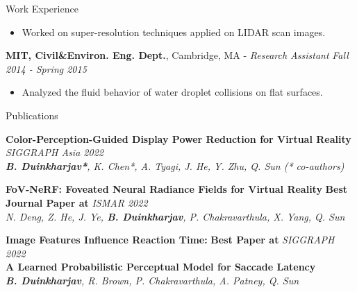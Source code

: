 \documentclass{resume}
\begin{document}
\begin{area}{Work Experience}
        \begin{itemize}
            \item Worked on super-resolution techniques applied on LIDAR scan images.
        \end{itemize}
    \item
        \textbf{MIT, Civil\&Environ. Eng. Dept.}, Cambridge, MA - \emph{Research Assistant} \hfill \emph{Fall 2014 - Spring 2015}
        \begin{itemize}
            \item Analyzed the fluid behavior of water droplet collisions on flat surfaces.
        \end{itemize}
\end{area}

\begin{area}{Publications}
    \item
        \textbf{Color-Perception-Guided Display Power Reduction for Virtual Reality}
        \hfill
        \emph{SIGGRAPH Asia 2022}
        \\%
        \hspace*{2mm}
        \emph{\textbf{B. Duinkharjav*}, K. Chen*, A. Tyagi, J. He, Y. Zhu, Q. Sun (* co-authors)}
    \item
        \textbf{FoV-NeRF: Foveated Neural Radiance Fields for Virtual Reality}
        \hfill
        \textbf{Best Journal Paper at}
        \emph{ISMAR 2022}
        \\%
        \hspace*{2mm}
        \emph{N. Deng, Z. He, J. Ye, \textbf{B. Duinkharjav}, P. Chakravarthula, X. Yang, Q. Sun}
    \item
        \textbf{Image Features Influence Reaction Time:}
        \hfill
        \textbf{Best Paper at}
        \emph{SIGGRAPH 2022}\\
        \textbf{A Learned Probabilistic Perceptual Model for Saccade Latency}
        \\%
        \hspace*{2mm}
        \emph{\textbf{B. Duinkharjav}, R. Brown, P. Chakravarthula, A. Patney, Q. Sun}

\end{area}
\end{document}
